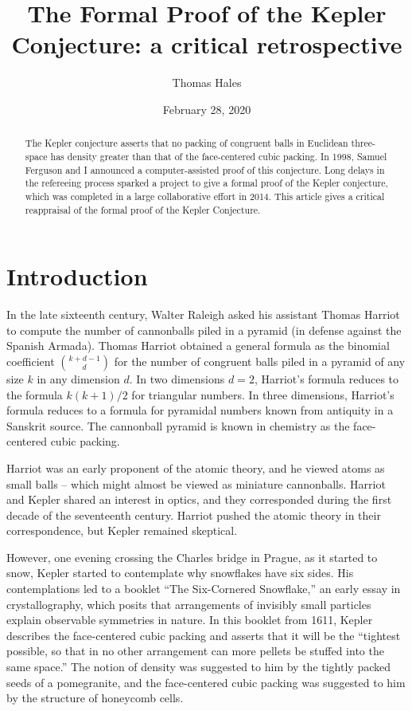 \documentclass{amsart}
\title{The Formal Proof of the Kepler Conjecture: a critical retrospective}
\author{Thomas Hales}
\date{}
\date{February 28, 2020}
\begin{document}
\maketitle

\begin{abstract} 
  The Kepler conjecture asserts that no packing of congruent balls in
  Euclidean three-space has density greater than that of the
  face-centered cubic packing.  In 1998, Samuel Ferguson and I
  announced a computer-assisted proof of this conjecture.  Long delays
  in the refereeing process sparked a project to give a formal proof
  of the Kepler conjecture, which was completed in a large
  collaborative effort in 2014.  This article gives a critical
  reappraisal of the formal proof of the Kepler Conjecture.
\end{abstract}

\baselineskip
{}\baselineskip

\newenvironment{blockquote}{%
  \par%
  \medskip%
  \baselineskip=0.7\baselineskip%
  \leftskip=2em\rightskip=2em%
  \noindent\ignorespaces}{%
  \par\medskip}

\section{Introduction}

In the late sixteenth century, Walter Raleigh asked his assistant Thomas
Harriot to compute the number of cannonballs piled in a pyramid (in
defense against the Spanish Armada).  Thomas Harriot obtained a
general formula as the binomial coefficient ${k+d-1\choose d}$ for the
number of congruent balls piled in a pyramid of any size $k$ in any
dimension $d$.  In two dimensions $d=2$, Harriot's formula reduces to
the formula $k(k+1)/2$ for triangular numbers.  In three dimensions,
Harriot's formula reduces to a formula for pyramidal numbers known
from antiquity in a Sanskrit source.  The cannonball pyramid is known
in chemistry as the face-centered cubic packing.

Harriot was an early proponent of the atomic theory, and he viewed
atoms as small balls -- which might almost be viewed as miniature
cannonballs.  Harriot and Kepler shared an interest in optics, and
they corresponded during the first decade of the seventeenth century.
Harriot pushed the atomic theory in their correspondence, but Kepler
remained skeptical.

However, one evening crossing the Charles bridge in Prague, as it
started to snow, Kepler started to contemplate why snowflakes have six
sides.  His contemplations led to a booklet ``The Six-Cornered
Snowflake,'' an early essay in crystallography, which posits that
arrangements of invisibly small particles explain observable
symmetries in nature.  In this booklet from 1611, Kepler
describes the face-centered cubic packing and asserts that it will be
the ``tightest possible, so that in no other arrangement can more
pellets be stuffed into the same space.'' The notion of density was
suggested to him by the tightly packed seeds of a pomegranite, and the
face-centered cubic packing was suggested to him by the structure of
honeycomb cells.
\end{document}
